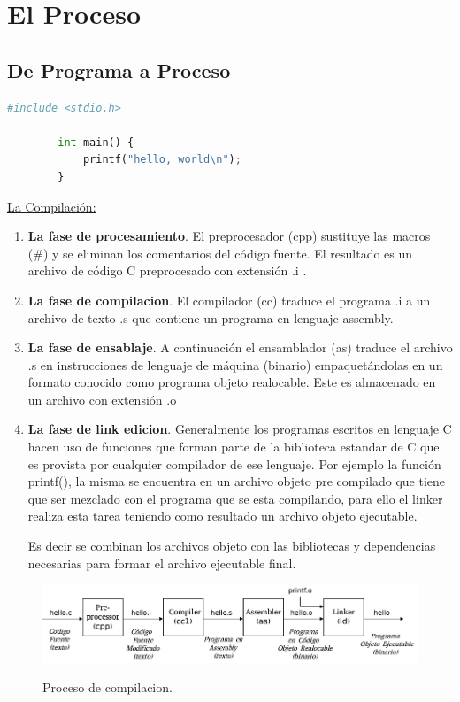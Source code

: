 \documentclass[../main.tex]{subfiles}
\begin{document}
\section{El Proceso}

\subsection{De Programa a Proceso}
    \begin{lstlisting}[language=Python, caption=hola mundo.]
        #include <stdio.h>

        int main() {
            printf("hello, world\n");
        }
    \end{lstlisting}

    \underline{La Compilación:}
    \begin{enumerate}
        \item \textbf{La fase de procesamiento}. El preprocesador (cpp) sustituye las macros (\#) y se eliminan los comentarios del código fuente. El resultado es un archivo de código C preprocesado con extensión .i .
        \item \textbf{La fase de compilacion}. El compilador (cc) traduce el programa .i a un archivo de texto .s que contiene un programa en lenguaje assembly.
        \item \textbf{La fase de ensablaje}. A continuación el ensamblador (as) traduce el archivo .s en instrucciones de lenguaje de máquina (binario) empaquetándolas en un formato conocido como programa objeto realocable. Este es almacenado en un archivo con extensión .o
        \item \textbf{La fase de link edicion}. Generalmente los programas escritos en lenguaje C hacen uso de funciones que forman parte de la biblioteca estandar de C que es provista por cualquier compilador de ese lenguaje. Por ejemplo la función printf(), la misma se encuentra en un archivo objeto pre compilado que tiene que ser mezclado con el programa que se esta compilando, para ello el linker realiza esta tarea teniendo como resultado un archivo objeto ejecutable. 
        
        Es decir se combinan los archivos objeto con las bibliotecas y dependencias necesarias para formar el archivo ejecutable final.
    \end{enumerate}

    \begin{figure}[bh]
        \centering
        \includegraphics[scale=0.33]{../images/compilation.jpg}
        \label{fig:img1}
        \caption{Proceso de compilacion.}
    \end{figure}
\end{document}
